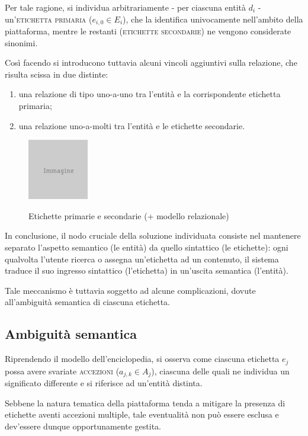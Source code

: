 Per tale ragione, si individua arbitrariamente - per ciascuna entità $d_i$ - un'\textsc{etichetta primaria} ($e_{i,0} \in E_i$), che la identifica univocamente nell'ambito della piattaforma, mentre le restanti (\textsc{etichette secondarie}) ne vengono considerate sinonimi.

Così facendo si introducono tuttavia alcuni vincoli aggiuntivi sulla relazione, che risulta scissa in due distinte:
\begin{enumerate}
	\item una relazione di tipo uno-a-uno tra l'entità e la corrispondente etichetta primaria;
	\item una relazione uno-a-molti tra l'entità e le etichette secondarie.
\end{enumerate}

\begin{figure}[ht]
	\begin{center}
		\includegraphics{placeholder.png}
		\label{fig:tesi:stage:fase-uno:entita-sintassi-semantica}
		\caption{Etichette primarie e secondarie (+ modello relazionale)}
	\end{center}
\end{figure}

In conclusione, il nodo cruciale della soluzione individuata consiste nel mantenere separato l'aspetto semantico (le entità) da quello sintattico (le etichette): ogni qualvolta l'utente ricerca o assegna un'etichetta ad un contenuto, il sistema traduce il suo ingresso sintattico (l'etichetta) in un'uscita semantica (l'entità).

Tale meccanismo è tuttavia soggetto ad alcune complicazioni, dovute all'ambiguità semantica di ciascuna etichetta.

\subsection{Ambiguità semantica}
Riprendendo il modello dell'enciclopedia, si osserva come ciascuna etichetta $e_j$ possa avere svariate \textsc{accezioni} ($a_{j,k} \in A_j$), ciascuna delle quali ne individua un significato differente e si riferisce ad un'entità distinta.

Sebbene la natura tematica della piattaforma tenda a mitigare la presenza di etichette aventi accezioni multiple, tale eventualità non può essere esclusa e dev'essere dunque opportunamente gestita.

